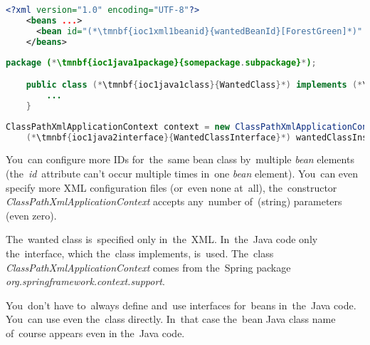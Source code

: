 \begin{lstlisting}[language=XML, title={Configuration XML}]
    <?xml version="1.0" encoding="UTF-8"?>
    <beans ...>
      <bean id="(*\tmnbf{ioc1xml1beanid}{wantedBeanId}[ForestGreen]*)" class="(*\tmnbf{ioc1xml1package}{somepackage.subpackage}[ForestGreen]*).(*\tmnbf{ioc1xml1class}{WantedClass}[ForestGreen]*)"/>
    </beans>
\end{lstlisting}
\begin{lstlisting}[language=Java, title={Wanted class}]
    package (*\tmnbf{ioc1java1package}{somepackage.subpackage}*);

    public class (*\tmnbf{ioc1java1class}{WantedClass}*) implements (*\tmnbf{ioc1java1interface}{WantedClassInterface}*) {
        ...
    }
\end{lstlisting}
\begin{lstlisting}[language=Java, title={Usage}]
    ClassPathXmlApplicationContext context = new ClassPathXmlApplicationContext("configurationFile.xml");
    (*\tmnbf{ioc1java2interface}{WantedClassInterface}*) wantedClassInstance = context.getBean("(*\tmnbf{ioc1java2beanid}{wantedBeanId}[ForestGreen]*)", (*\tmnbf{ioc1java2interface2}{WantedClassInterface}*).class);
\end{lstlisting}

\noindent You~can configure more IDs for~the~same bean class by~multiple \textit{bean} elements (the~\textit{id}~attribute can't occur multiple times in~one \textit{bean} element).
You~can even specify more XML configuration files (or~even none at~all), the~constructor \mbox{\textit{ClassPathXmlApplicationContext}} accepts any~number of~(string) parameters (even zero).

The~wanted class is~specified only in~the~XML\@.
In~the~Java code only the~interface, which the~class implements, is~used.
The~class \textit{ClassPathXmlApplicationContext} comes from the~Spring package \textit{org.springframework.context.support}.

\note You~don't have to~always define and~use interfaces for~beans in~the~Java code.
You~can use even the~class directly.
In~that case the~bean Java class name of~course appears even in the~Java code.
\newpage

